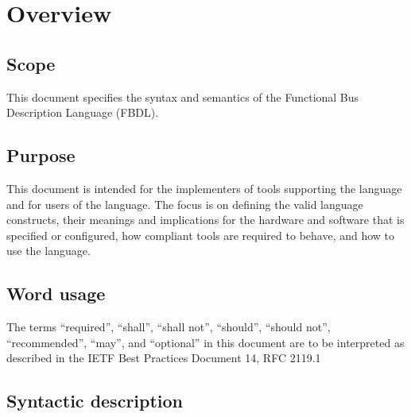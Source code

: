 \chapter{Overview}

\section{Scope}

This document specifies the syntax and semantics of the Functional Bus Description Language (FBDL).

\section{Purpose}

This document is intended for the implementers of tools supporting the language and for users of the language.
The focus is on defining the valid language constructs, their meanings and implications for the hardware and software that is specified or configured, how compliant tools are required to behave, and how to use the language.

\section{Word usage}

The terms “required”, “shall”, “shall not”, “should”, “should not”, “recommended”, “may”, and “optional” in this document are to be interpreted as described in the IETF Best Practices Document 14, RFC 2119.1

\section{Syntactic description}

